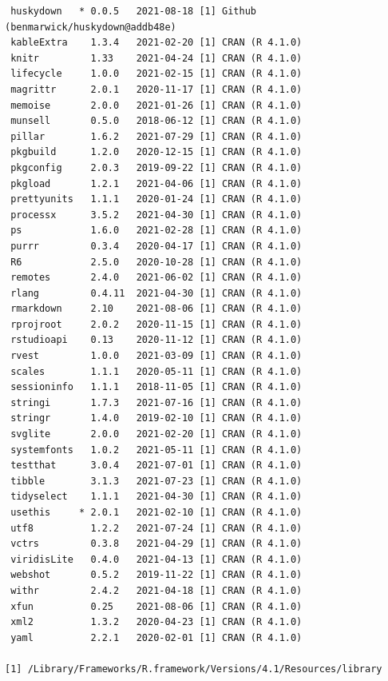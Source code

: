 \documentclass [11pt, proquest] {uwthesis}[2015/03/03]
\begin{document}
\begin{verbatim}
 huskydown   * 0.0.5   2021-08-18 [1] Github (benmarwick/huskydown@addb48e)
 kableExtra    1.3.4   2021-02-20 [1] CRAN (R 4.1.0)                       
 knitr         1.33    2021-04-24 [1] CRAN (R 4.1.0)                       
 lifecycle     1.0.0   2021-02-15 [1] CRAN (R 4.1.0)                       
 magrittr      2.0.1   2020-11-17 [1] CRAN (R 4.1.0)                       
 memoise       2.0.0   2021-01-26 [1] CRAN (R 4.1.0)                       
 munsell       0.5.0   2018-06-12 [1] CRAN (R 4.1.0)                       
 pillar        1.6.2   2021-07-29 [1] CRAN (R 4.1.0)                       
 pkgbuild      1.2.0   2020-12-15 [1] CRAN (R 4.1.0)                       
 pkgconfig     2.0.3   2019-09-22 [1] CRAN (R 4.1.0)                       
 pkgload       1.2.1   2021-04-06 [1] CRAN (R 4.1.0)                       
 prettyunits   1.1.1   2020-01-24 [1] CRAN (R 4.1.0)                       
 processx      3.5.2   2021-04-30 [1] CRAN (R 4.1.0)                       
 ps            1.6.0   2021-02-28 [1] CRAN (R 4.1.0)                       
 purrr         0.3.4   2020-04-17 [1] CRAN (R 4.1.0)                       
 R6            2.5.0   2020-10-28 [1] CRAN (R 4.1.0)                       
 remotes       2.4.0   2021-06-02 [1] CRAN (R 4.1.0)                       
 rlang         0.4.11  2021-04-30 [1] CRAN (R 4.1.0)                       
 rmarkdown     2.10    2021-08-06 [1] CRAN (R 4.1.0)                       
 rprojroot     2.0.2   2020-11-15 [1] CRAN (R 4.1.0)                       
 rstudioapi    0.13    2020-11-12 [1] CRAN (R 4.1.0)                       
 rvest         1.0.0   2021-03-09 [1] CRAN (R 4.1.0)                       
 scales        1.1.1   2020-05-11 [1] CRAN (R 4.1.0)                       
 sessioninfo   1.1.1   2018-11-05 [1] CRAN (R 4.1.0)                       
 stringi       1.7.3   2021-07-16 [1] CRAN (R 4.1.0)                       
 stringr       1.4.0   2019-02-10 [1] CRAN (R 4.1.0)                       
 svglite       2.0.0   2021-02-20 [1] CRAN (R 4.1.0)                       
 systemfonts   1.0.2   2021-05-11 [1] CRAN (R 4.1.0)                       
 testthat      3.0.4   2021-07-01 [1] CRAN (R 4.1.0)                       
 tibble        3.1.3   2021-07-23 [1] CRAN (R 4.1.0)                       
 tidyselect    1.1.1   2021-04-30 [1] CRAN (R 4.1.0)                       
 usethis     * 2.0.1   2021-02-10 [1] CRAN (R 4.1.0)                       
 utf8          1.2.2   2021-07-24 [1] CRAN (R 4.1.0)                       
 vctrs         0.3.8   2021-04-29 [1] CRAN (R 4.1.0)                       
 viridisLite   0.4.0   2021-04-13 [1] CRAN (R 4.1.0)                       
 webshot       0.5.2   2019-11-22 [1] CRAN (R 4.1.0)                       
 withr         2.4.2   2021-04-18 [1] CRAN (R 4.1.0)                       
 xfun          0.25    2021-08-06 [1] CRAN (R 4.1.0)                       
 xml2          1.3.2   2020-04-23 [1] CRAN (R 4.1.0)                       
 yaml          2.2.1   2020-02-01 [1] CRAN (R 4.1.0)                       

[1] /Library/Frameworks/R.framework/Versions/4.1/Resources/library
\end{verbatim}
\backmatter
\end{document}
